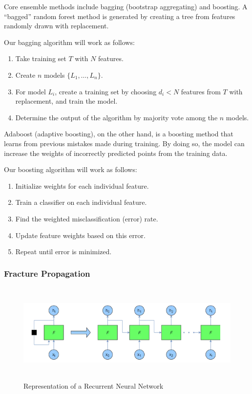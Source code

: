 Core ensemble methods include bagging (bootstrap aggregating) and boosting. A ``bagged'' random forest method is generated by creating a tree from features randomly drawn with replacement. 

Our bagging algorithm will work as follows:

\begin{enumerate}
\item Take training set $T$ with $N$ features.
\item Create $n$ models $\{L_1,\dots,L_n\}$.
\item For model $L_i$, create a training set by choosing $d_i<N$ features from $T$ with replacement, and train the model.
\item Determine the output of the algorithm by majority vote among the $n$ models.
\end{enumerate}

Adaboost (adaptive boosting), on the other hand, is a boosting method that learns from previous mistakes made during training. By doing so, the model can increase the weights of incorrectly predicted points from the training data.

Our boosting algorithm will work as follows:

\begin{enumerate}
    \item Initialize weights for each individual feature.
    \item Train a classifier on each individual feature.
    \item Find the weighted misclassification (error) rate.
    \item Update feature weights based on this error.
    \item Repeat until error is minimized.
\end{enumerate}


\subsubsection{Fracture Propagation}

\begin{figure}[!b]
    \centering
    \noindent
\includegraphics[width=12cm , height = 5cm]{picture/rnn.PNG}
    \caption{Representation of a Recurrent Neural Network}
    \label{fig:rnn}
\end{figure}

